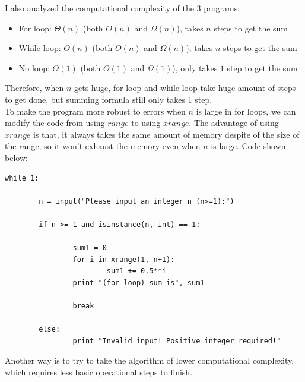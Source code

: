 I also analyzed the computational complexity of the 3 programs:
\begin{itemize}
\item For loop: $\Theta(n)$ (both $O(n)$ and $\Omega(n)$), takes $n$ steps to get the sum
\item While loop: $\Theta(n)$ (both $O(n)$ and $\Omega(n)$), takes $n$ steps to get the sum
\item No loop: $\Theta(1)$ (both $O(1)$ and $\Omega(1)$), only takes $1$ step to get the sum 
\end{itemize}

Therefore, when $n$ gets huge, for loop and while loop take huge amount of steps to get done, but summing formula still only takes 1 step. \\

To make the program more robust to errors when $n$ is large in for loops, we can modify the code from using $range$ to using $xrange$. The advantage of using $xrange$ is that, it always takes the same amount of memory despite of the size of the range, so it won't exhaust the memory even when $n$ is large.    Code shown below: 

\begin{verbatim}
while 1:

        n = input("Please input an integer n (n>=1):")

        if n >= 1 and isinstance(n, int) == 1:
                
                sum1 = 0
                for i in xrange(1, n+1):
                        sum1 += 0.5**i
                print "(for loop) sum is", sum1

                break

        else:
                print "Invalid input! Positive integer required!"
\end{verbatim}

Another way is to try to take the algorithm of lower computational complexity, which requires less basic operational steps to finish. \\



